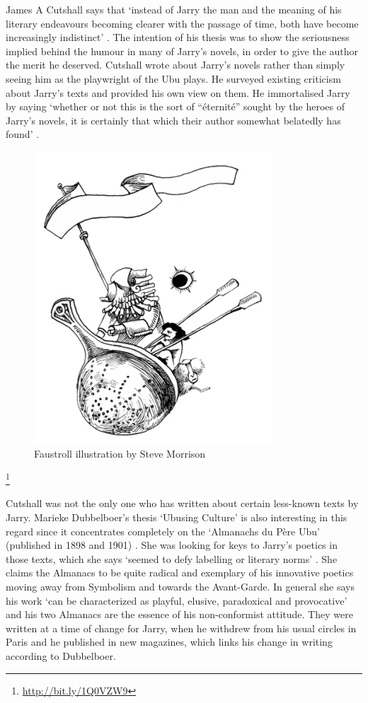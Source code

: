 James A Cutshall says that `instead of Jarry the man and the meaning of his literary endeavours becoming clearer with the passage of time, both have become increasingly indistinct' \autocite[p.246]{Cutshall1988}. The intention of his thesis was to show the seriousness implied behind the humour in many of Jarry's novels, in order to give the author the merit he deserved. Cutshall wrote about Jarry's novels rather than simply seeing him as the playwright of the Ubu plays. He surveyed existing criticism about Jarry's texts and provided his own view on them. He immortalised Jarry by saying `whether or not this is the sort of ``éternité'' sought by the heroes of Jarry\rq s novels, it is certainly that which their author somewhat belatedly has found' \autocite[p.248]{Cutshall1988}.

\begin{figure}[htb]
  \centering
  \includegraphics[height=0.3\textheight]{images/faustroll}
  \caption[Faustroll]{Faustroll illustration by Steve Morrison}
\label{fig:FAUSTROLL}
\end{figure}\footnote{\url{http://bit.ly/1Q0VZW9}} %

Cutshall was not the only one who has written about certain less-known texts by Jarry. Marieke Dubbelboer's thesis `Ubusing Culture' is also interesting in this regard since it concentrates completely on the `Almanachs du Père Ubu' (published in 1898 and 1901) \autocite{Dubbelboer2009}. She was looking for keys to Jarry's poetics in those texts, which she says `seemed to defy labelling or literary norms' \autocite[p.10]{Dubbelboer2009}. She claims the Almanacs to be quite radical and exemplary of his innovative poetics moving away from Symbolism and towards the Avant-Garde. In general she says his work `can be characterized as playful, elusive, paradoxical and provocative' \autocite[p.197]{Dubbelboer2009} and his two Almanacs are the essence of his non-conformist attitude. They were written at a time of change for Jarry, when he withdrew from his usual circles in Paris and he published in new magazines, which links his change in writing according to Dubbelboer.


